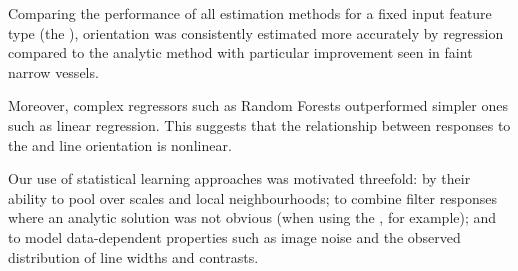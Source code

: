 \label{s:exp_retinogram_orientation_wrt_regressor}
%
Comparing the performance of all estimation methods for a fixed input feature type (the \dtcwt{}), orientation was consistently estimated more accurately by regression compared to the analytic method with particular improvement seen in faint narrow vessels. 

Moreover, complex regressors such as Random Forests outperformed simpler ones such as linear regression. This suggests that the relationship between responses to the \dtcwt{} and line orientation is nonlinear.

Our use of statistical learning approaches was motivated threefold: by their ability to pool over scales and local neighbourhoods; to combine filter responses where an analytic solution was not obvious (when using the \dtcwt{}, for example); and to model data-dependent properties such as image noise and the observed distribution of line widths and contrasts. 

